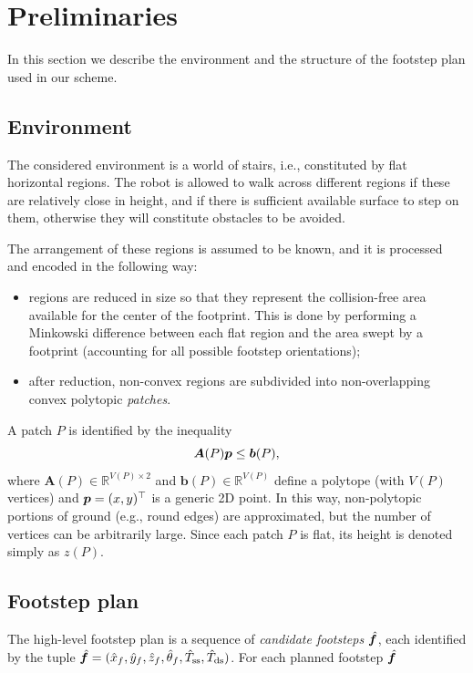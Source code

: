 \section{Preliminaries}
\label{sec:FAPA:Preliminaries}
In this section we describe the environment and the structure of the footstep
plan used in our scheme.

\subsection{Environment}
The considered environment is a world of stairs, i.e., constituted by flat
horizontal regions. The robot is allowed to walk across different regions if
these are relatively close in height, and if there is sufficient available
surface to step on them, otherwise they will constitute obstacles to be avoided.

The arrangement of these regions is assumed to be known, and it is processed
and encoded in the following way:
\begin{itemize}
    \item regions are reduced in size so that they represent the collision-free
        area available for the center of the footprint. This is done by
        performing a Minkowski difference between each flat region and the
        area swept by a footprint (accounting for all possible footstep orientations);
    \item after reduction, non-convex regions are subdivided into
        non-overlapping convex polytopic {\em patches}.
\end{itemize}
A patch $P$ is identified by the inequality
\begin{equation*}
{\bm{A}}(P) {\bm{p}} \le {\bm{b}}(P),
\end{equation*}
where $\bm{A}(P) \in \mathbb{R}^{V(P) \times 2}$ and
$\bm{b}(P) \in \mathbb{R}^{V(P)} $ define a polytope (with $V(P)$ vertices)
and ${\bm{p}} = (x, y)^\top$ is a generic 2D point. 
In this way, non-polytopic portions of ground (e.g., round edges) are
approximated, but the number of vertices can be arbitrarily large.
Since each patch $P$ is flat, its height is denoted simply as $z(P)$.

\subsection{Footstep plan}
The high-level footstep plan is a sequence of {\em candidate footsteps}
$\hat{{\bm{f}}}$, each identified by the tuple
$\hat{{\bm{f}}} = (\hat x_f, \hat y_f, \hat z_f, \hat\theta_f, \hat T_{\rm ss}, \hat T_{\rm ds})$.
For each planned footstep $\hat{{\bm{f}}}$

